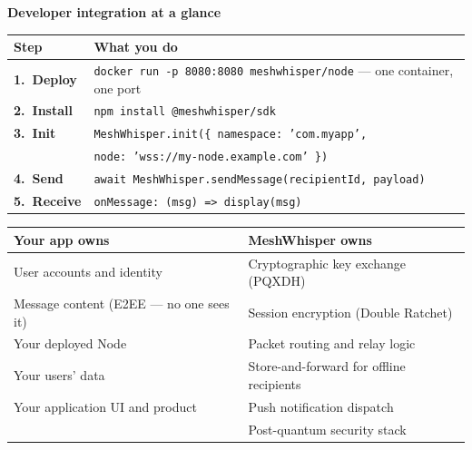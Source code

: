 \documentclass[11pt, a4paper]{article}
\begin{document}
\begin{mdframed}[
  backgroundcolor=mwlight,
  linecolor=mwaccent,
  linewidth=0.8pt,
  innerleftmargin=14pt,
  innerrightmargin=14pt,
  innertopmargin=10pt,
  innerbottommargin=10pt,
  roundcorner=4pt
]
\textbf{\color{mwblue}Developer integration at a glance}

\vspace{6pt}

\begin{tabularx}{\linewidth}{@{}>{\bfseries}lX@{}}
\toprule
Step & What you do \\
\midrule
1.\ Deploy  & \texttt{docker run -p 8080:8080 meshwhisper/node} — one container, one port \\[3pt]
2.\ Install & \texttt{npm install @meshwhisper/sdk} \\[3pt]
3.\ Init    & \texttt{MeshWhisper.init(\{ namespace: 'com.myapp',}\\
            & \texttt{\phantom{MeshWhisper.init(\{ }node: 'wss://my-node.example.com' \})} \\[3pt]
4.\ Send    & \texttt{await MeshWhisper.sendMessage(recipientId, payload)} \\[3pt]
5.\ Receive & \texttt{onMessage: (msg) => display(msg)} \\
\bottomrule
\end{tabularx}

\vspace{10pt}

\begin{tabularx}{\linewidth}{@{}XX@{}}
\toprule
\textbf{\color{mwblue}Your app owns} & \textbf{\color{mwblue}MeshWhisper owns} \\
\midrule
User accounts and identity & Cryptographic key exchange (PQXDH) \\
Message content (E2EE — no one sees it) & Session encryption (Double Ratchet) \\
Your deployed Node & Packet routing and relay logic \\
Your users' data & Store-and-forward for offline recipients \\
Your application UI and product & Push notification dispatch \\
 & Post-quantum security stack \\
\bottomrule
\end{tabularx}
\end{mdframed}

\vspace{6pt}
\end{document}
